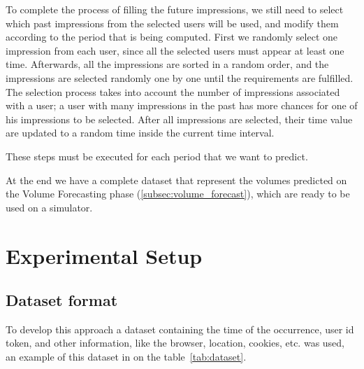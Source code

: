 To complete the process of filling the future impressions, we still need to
select which past impressions from the selected users will be used, and modify
them according to the period that is being computed. First we randomly
select one impression from each user, since all the selected users must appear at
least one time. Afterwards, all the impressions are sorted in a random order, and
the impressions are selected randomly one by one until the requirements are
fulfilled.
The selection process takes into account the number of impressions associated
with a user; a user with many impressions in the past has more chances for one
of his impressions to be selected.
After all impressions are selected, their time value are updated to a random time
inside the current time interval.

These steps must be executed for each period that we want to predict.

At the end we have a complete dataset that represent the volumes predicted on
the Volume Forecasting phase (\ref{subsec:volume_forecast}), which are ready to be used on a simulator.

\section{Experimental Setup}

\subsection{Dataset format}

To develop this approach a dataset containing the time of the occurrence, user
id token, and other information, like the browser, location, cookies, etc. was
used, an example of this dataset in on the table~\ref{tab:dataset}.


